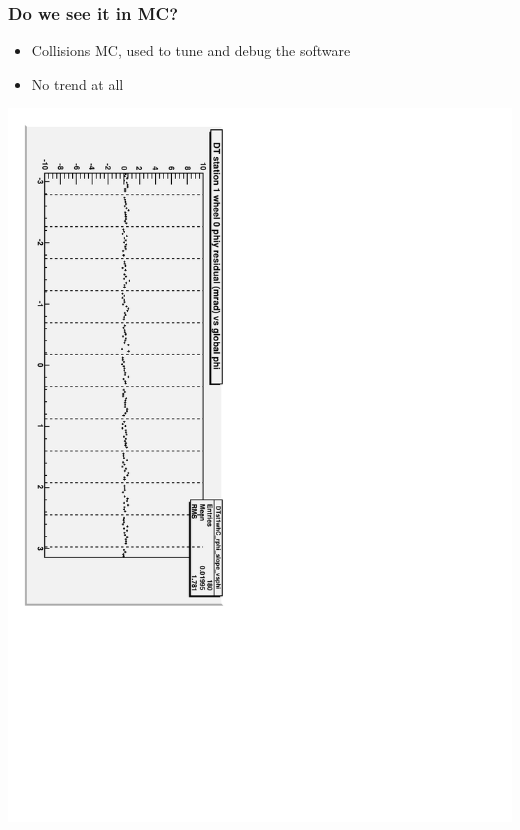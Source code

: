 \documentclass[compress]{beamer}
\begin{document}
\begin{frame}
\frametitle{Do we see it in MC?}

\begin{itemize}
\item Collisions MC, used to tune and debug the software
\item No trend at all
\end{itemize}

\includegraphics[height=\linewidth, angle=90]{possible_acoplanarity_idealmc.pdf}
\end{frame}


\end{document}
